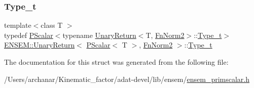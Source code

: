 \mbox{\label{structENSEM_1_1UnaryReturn_3_01PScalar_3_01T_01_4_00_01FnNorm2_01_4_a668c493a2fae41d6416ca55cc046b6b5}} 
\subsubsection{\texorpdfstring{Type\_t}{Type\_t}\hspace{0.1cm}{\footnotesize\ttfamily [3/3]}}
{\footnotesize\ttfamily template$<$class T $>$ \\
typedef \mbox{\hyperlink{classENSEM_1_1PScalar}{P\+Scalar}}$<$typename \mbox{\hyperlink{structENSEM_1_1UnaryReturn}{Unary\+Return}}$<$T, \mbox{\hyperlink{structENSEM_1_1FnNorm2}{Fn\+Norm2}}$>$\+::\mbox{\hyperlink{structENSEM_1_1UnaryReturn_3_01PScalar_3_01T_01_4_00_01FnNorm2_01_4_a668c493a2fae41d6416ca55cc046b6b5}{Type\+\_\+t}}$>$ \mbox{\hyperlink{structENSEM_1_1UnaryReturn}{E\+N\+S\+E\+M\+::\+Unary\+Return}}$<$ \mbox{\hyperlink{classENSEM_1_1PScalar}{P\+Scalar}}$<$ T $>$, \mbox{\hyperlink{structENSEM_1_1FnNorm2}{Fn\+Norm2}} $>$\+::\mbox{\hyperlink{structENSEM_1_1UnaryReturn_3_01PScalar_3_01T_01_4_00_01FnNorm2_01_4_a668c493a2fae41d6416ca55cc046b6b5}{Type\+\_\+t}}}



The documentation for this struct was generated from the following file\+:\begin{DoxyCompactItemize}
\item 
/\+Users/archanar/\+Kinematic\+\_\+factor/adat-\/devel/lib/ensem/\mbox{\hyperlink{adat-devel_2lib_2ensem_2ensem__primscalar_8h}{ensem\+\_\+primscalar.\+h}}\end{DoxyCompactItemize}
